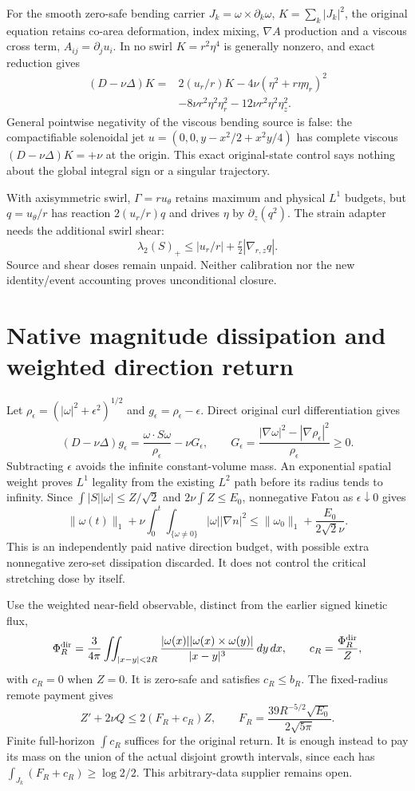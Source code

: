 \documentclass[11pt]{article}
\begin{document}
For the smooth zero-safe bending carrier
$J_k=\omega\times\partial_k\omega$, $K=\sum_k|J_k|^2$,
the original equation retains co-area deformation, index mixing,
$\nabla A$ production and a viscous cross term, $A_{ij}=\partial_j u_i$.
In no swirl $K=r^2\eta^4$ is generally nonzero, and exact reduction gives
\[
\begin{split}
 (D-\nu\Delta)K={}&2(u_r/r)K
 -4\nu(\eta^2+r\eta\eta_r)^2\\
 &-8\nu r^2\eta^2\eta_r^2-12\nu r^2\eta^2\eta_z^2.
\end{split}
\]
General pointwise negativity of the viscous bending source is false:
the compactifiable solenoidal jet
$u=(0,0,y-x^2/2+x^2y/4)$ has complete viscous
$(D-\nu\Delta)K=+\nu$ at the origin. This exact original-state control
says nothing about the global integral sign or a singular trajectory.

With axisymmetric swirl, $\Gamma=ru_\theta$ retains maximum and physical
$L^1$ budgets, but $q=u_\theta/r$ has reaction $2(u_r/r)q$ and drives
$\eta$ by $\partial_z(q^2)$. The strain adapter needs the additional
swirl shear:
\[
 \lambda_2(S)_+\le |u_r/r|+\tfrac r2|\nabla_{r,z}q|.
\]
Source and shear doses remain unpaid. Neither calibration nor the new
identity/event accounting proves unconditional closure.

\section{Native magnitude dissipation and weighted direction return}
Let $\rho_\epsilon=(|\omega|^2+\epsilon^2)^{1/2}$ and
$g_\epsilon=\rho_\epsilon-\epsilon$. Direct original curl differentiation gives
\[
 (D-\nu\Delta)g_\epsilon
 =\frac{\omega\cdot S\omega}{\rho_\epsilon}-\nu G_\epsilon,
 \qquad G_\epsilon=
 \frac{|\nabla\omega|^2-|\nabla\rho_\epsilon|^2}{\rho_\epsilon}\ge0.
\]
Subtracting $\epsilon$ avoids the infinite constant-volume mass.
An exponential spatial weight proves $L^1$ legality from the existing
$L^2$ path before its radius tends to infinity. Since
$\int|S||\omega|\le Z/\sqrt2$ and $2\nu\int Z\le E_0$,
nonnegative Fatou as $\epsilon\downarrow0$ gives
\[
 \|\omega(t)\|_1+\nu\int_0^t\!\int_{\{\omega\ne0\}}
 |\omega||\nabla n|^2
 \le\|\omega_0\|_1+\frac{E_0}{2\sqrt2\nu}.
\]
This is an independently paid native direction budget, with possible
extra nonnegative zero-set dissipation discarded. It does not control
the critical stretching dose by itself.

Use the weighted near-field observable, distinct from the earlier
signed kinetic flux,
\[
 \Phi_R^{\rm dir}=\frac3{4\pi}\iint_{|x-y|<2R}
 \frac{|\omega(x)||\omega(x)\times\omega(y)|}{|x-y|^3}\,dy\,dx,
 \qquad c_R=\frac{\Phi_R^{\rm dir}}Z,
\]
with $c_R=0$ when $Z=0$. It is zero-safe and satisfies $c_R\le b_R$.
The fixed-radius remote payment gives
\[
 Z'+2\nu Q\le2(F_R+c_R)Z,
 \qquad F_R=\frac{39R^{-5/2}\sqrt{E_0}}{2\sqrt{5\pi}}.
\]
Finite full-horizon $\int c_R$ suffices for the original return.
It is enough instead to pay its mass on the union of the actual disjoint
growth intervals, since each has $\int_{J_k}(F_R+c_R)\ge\log2/2$.
This arbitrary-data supplier remains open.
\end{document}

